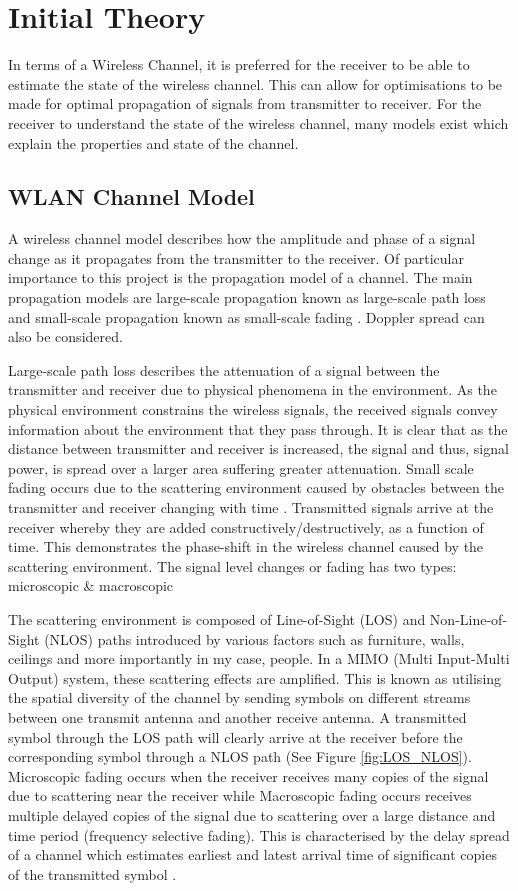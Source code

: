 \section{Initial Theory}
In terms of a Wireless Channel, it is preferred for the receiver to be able to estimate the state of the wireless channel. This can allow for optimisations to be made for optimal propagation of signals from transmitter to receiver. For the receiver to understand the state of the wireless channel, many models exist which explain the properties and state of the channel.
\subsection{WLAN Channel Model}
A wireless channel model describes how the amplitude and phase of a signal change as it propagates from the transmitter to the receiver. Of particular importance to this project is the propagation model of a channel. The main propagation models are large-scale propagation known as large-scale path loss and small-scale propagation known as small-scale fading \citep{articleWLAN}. Doppler spread can also be considered. \par
Large-scale path loss describes the attenuation of a signal between the transmitter and receiver due to physical phenomena in the environment. As the physical environment constrains the wireless signals, the received signals convey information about the environment that they pass through. It is clear that as the distance between transmitter and receiver is increased, the signal and thus, signal power, is spread over a larger area suffering greater attenuation. Small scale fading occurs due to the scattering environment caused by obstacles between the transmitter and receiver changing with time \citep{articleWLAN}. Transmitted signals arrive at the receiver whereby they are added constructively/destructively, as a function of time. This demonstrates the phase-shift in the wireless channel caused by the scattering environment. The signal level changes or fading has two types: microscopic \& macroscopic \citep{channelModels}\par
The scattering environment is composed of Line-of-Sight (LOS) and Non-Line-of-Sight (NLOS) paths introduced by various factors such as furniture, walls, ceilings and more importantly in my case, people. In a MIMO (Multi Input-Multi Output) system, these scattering effects are amplified. This is known as utilising the spatial diversity of the channel by sending symbols on different streams between one transmit antenna and another receive antenna. A transmitted symbol through the LOS path will clearly arrive at the receiver before the corresponding symbol through a NLOS path (See Figure \ref{fig:LOS_NLOS}). Microscopic fading occurs when the receiver receives many copies of the signal due to scattering near the receiver while Macroscopic fading occurs receives multiple delayed copies of the signal due to scattering over a large distance and time period (frequency selective fading). This is characterised by the delay spread of a channel which estimates earliest and latest arrival time of significant copies of the transmitted symbol \citep{channelModels, articleWLAN}. \par
